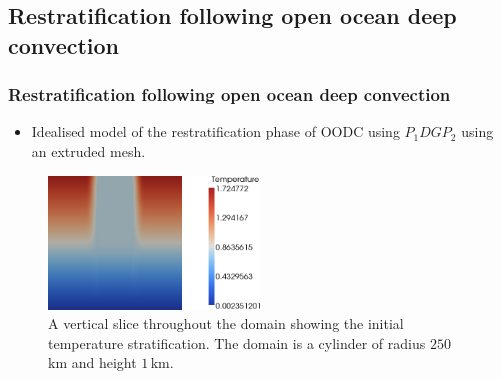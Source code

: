 \subsection{Restratification following open ocean deep convection}

\begin{frame}
    \frametitle{Restratification following open ocean deep convection}
\begin{itemize}
\item Idealised model of the restratification phase of OODC using $P_1DGP_2$ using an extruded mesh.
\end{itemize}
\begin{figure}
\includegraphics[width=0.5\textwidth]{./restratification_after_oodc/rousset-init.png}
\caption{A vertical slice throughout the domain showing the initial temperature stratification. The domain is a cylinder of radius $250 \,$km and height $1\,$km.}
\end{figure}
\end{frame}
%
